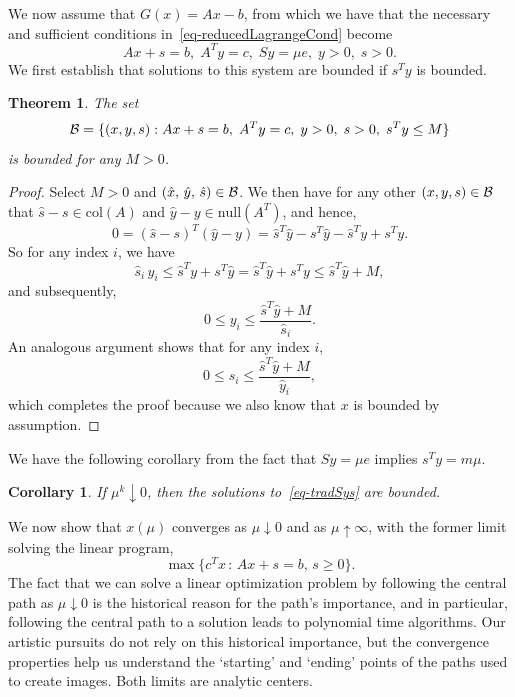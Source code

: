 \documentclass{article}
\newtheorem{theorem}{Theorem}
\newtheorem{corollary}{Corollary}
\def\cB{{\cal B}}
\def\xh{\hat{x}}
\def\yh{\hat{y}}
\def\sh{\hat{s}}
\begin{document}
We now assume that $G(x) = Ax - b$, from which we have that the necessary and sufficient 
conditions in~\eqref{eq-reducedLagrangeCond} become
\begin{equation} \label{eq-tradSys}
Ax + s = b, \; A^T y = c, \; Sy = \mu e, \; y > 0, \; s > 0.
\end{equation}
We first establish that solutions to this system are bounded if $s^T y$ is bounded.
\begin{theorem} \label{thm-boundedCP}
The set
\[
\cB = \{(x,y,s) : 
    Ax + s = b, \; A^T y = c, \; y > 0, \; s > 0, \; s^T y \le M \}
\]
is bounded for any $M > 0$.
\end{theorem}
\begin{proof}
Select $M > 0$ and $(\xh, \, \yh, \, \sh) \in \cB$. We then have for 
any other $(x,y,s) \in \cB$ that $\sh - s \in \mbox{col}(A)$ and 
$\yh - y \in \mbox{null}(A^T)$, and hence,
\[
0 = (\sh - s)^T(\yh - y) = \sh^T\yh - s^T\yh - \sh^Ty + s^Ty.
\]
So for any index $i$, we have
\[
\sh_i \, y_i \le \sh^T y + s^T \yh = \sh^T \yh + s^T y \le \sh^T \yh + M,
\]
and subsequently,
\[
0 \le y_i \le \frac{\sh^T \yh + M}{\sh_i}.
\]
An analogous argument shows that for any index $i$, 
\[
0 \le s_i \le \frac{\sh^T \yh + M}{\yh_i},
\]
which completes the proof because we also know that $x$ is 
bounded by assumption.
\end{proof}
\noindent We have the following corollary from the fact that 
$Sy = \mu e$ implies $s^T y = m \mu$.
\begin{corollary} \label{cor-boundedLevelSet}
If $\mu^k \downarrow 0$, then the solutions to~\eqref{eq-tradSys} 
are bounded.
\end{corollary}

We now show that $x(\mu)$ converges as $\mu \downarrow 0$ and as 
$\mu \uparrow \infty$, with the former limit solving the linear program,
\[
\max \{ c^T x \, : \, Ax + s = b, \, s \ge 0 \}.
\]
The fact that we can solve a linear optimization problem by following
the central path as $\mu \downarrow 0$ is the historical reason for the
path's importance, and in particular, following the central path to a
solution leads to polynomial time algorithms. Our artistic pursuits do
not rely on this historical importance, but the convergence properties
help us understand the `starting' and `ending' points of the paths 
used to create images. Both limits are analytic centers.
\end{document}
